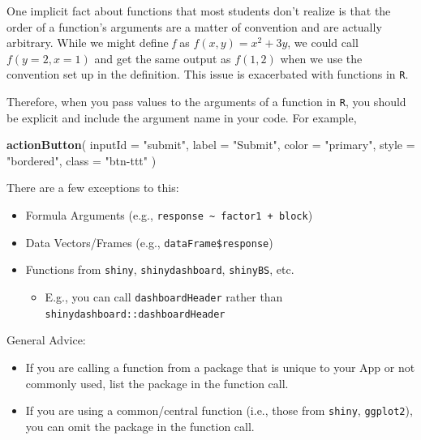 \documentclass[
]{book}
\newenvironment{Shaded}{\begin{snugshade}}{\end{snugshade}}
\newcommand{\DataTypeTok}[1]{\textcolor[rgb]{0.13,0.29,0.53}{#1}}
\newcommand{\KeywordTok}[1]{\textcolor[rgb]{0.13,0.29,0.53}{\textbf{#1}}}
\newcommand{\NormalTok}[1]{#1}
\newcommand{\StringTok}[1]{\textcolor[rgb]{0.31,0.60,0.02}{#1}}
\providecommand{\tightlist}{%
  \setlength{\itemsep}{0pt}\setlength{\parskip}{0pt}}
\begin{document}
One implicit fact about functions that most students don't realize is that the order of a function's arguments are a matter of convention and are actually arbitrary. While we might define \emph{f} as \(f(x,y) = x^2+3y\), we could call \(f(y=2,x=1)\) and get the same output as \(f(1,2)\) when we use the convention set up in the definition. This issue is exacerbated with functions in \texttt{R}.

Therefore, when you pass values to the arguments of a function in \texttt{R}, you should be explicit and include the argument name in your code. For example,

\begin{Shaded}
\begin{Highlighting}[]
\KeywordTok{actionButton}\NormalTok{(}
  \DataTypeTok{inputId =} \StringTok{"submit"}\NormalTok{,}
  \DataTypeTok{label =} \StringTok{"Submit"}\NormalTok{,}
  \DataTypeTok{color =} \StringTok{"primary"}\NormalTok{,}
  \DataTypeTok{style =} \StringTok{"bordered"}\NormalTok{,}
  \DataTypeTok{class =} \StringTok{"btn-ttt"}
\NormalTok{)}
\end{Highlighting}
\end{Shaded}

There are a few exceptions to this:

\begin{itemize}
\tightlist
\item
  Formula Arguments (e.g., \texttt{response\ \textasciitilde{}\ factor1\ +\ block})
\item
  Data Vectors/Frames (e.g., \texttt{dataFrame\$response})
\item
  Functions from \texttt{shiny}, \texttt{shinydashboard}, \texttt{shinyBS}, etc.

  \begin{itemize}
  \tightlist
  \item
    E.g., you can call \texttt{dashboardHeader} rather than \texttt{shinydashboard::dashboardHeader}
  \end{itemize}
\end{itemize}

General Advice:

\begin{itemize}
\tightlist
\item
  If you are calling a function from a package that is unique to your App or not commonly used, list the package in the function call.
\item
  If you are using a common/central function (i.e., those from \texttt{shiny}, \texttt{ggplot2}), you can omit the package in the function call.
\end{itemize}
\end{document}
